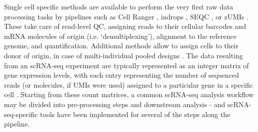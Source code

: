 \clearpage

Single cell specific methods are available to perform the very first raw data processing tasks by pipelines such as Cell Ranger \cite{zheng2017massively}, indrops \cite{klein2015droplet}, SEQC  \cite{azizi2018single}, or zUMIs \cite{parekh2018zumis}.
These take care of read-level QC, assigning reads to their cellular barcodes and mRNA molecules of origin (i.e. `demultiplexing'), alignment to the reference genome, and quantification. 
Additional methods allow to assign cells to their donor of origin, in case of  multi-individual pooled designs \cite{kang2018multiplexed, mccarthy2020cardelino}.
The data resulting from an scRNA-seq experiment are typically represented as an integer matrix of gene expression levels, with each entry representing the number of sequenced reads (or molecules, if UMIs were used) assigned to a particular gene in a specific
cell \cite{griffiths2018using}.
Starting from these count matrices, a common scRNA-seq analysis workflow may be divided into pre-processing steps and downstream analysis \cite{luecken2019current} - and scRNA-seq-specific tools have been implemented for several of the steps along the pipeline.\\

